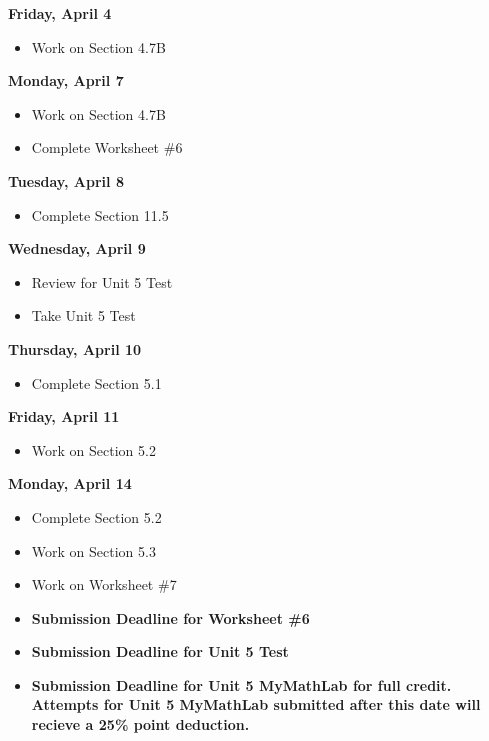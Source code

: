 \documentclass[11pt]{article}
\begin{document}
\textbf{Friday, April 4}

\begin{itemize}
\item Work on Section 4.7B
\end{itemize}

\textbf{Monday, April 7}

\begin{itemize}
\item Work on Section 4.7B
\item Complete Worksheet \#6
\end{itemize}

\textbf{Tuesday, April 8}

\begin{itemize}
\item Complete Section 11.5
\end{itemize}

\textbf{Wednesday, April 9}

\begin{itemize}
\item Review for Unit 5 Test
\item Take Unit 5 Test
\end{itemize}

\textbf{Thursday, April 10}

\begin{itemize}
\item Complete Section 5.1
\end{itemize}

\textbf{Friday, April 11}

\begin{itemize}
\item Work on Section 5.2
\end{itemize}

\textbf{Monday, April 14}

\begin{itemize}
\item Complete Section 5.2
\item Work on Section 5.3
\item Work on Worksheet \#7
\item \textbf{Submission Deadline for Worksheet \#6}
\item \textbf{Submission Deadline for Unit 5 Test}
\item \textbf{Submission Deadline for Unit 5 MyMathLab for full credit. Attempts for Unit 5 MyMathLab submitted after this date will recieve a 25\% point deduction.}
\end{itemize}
\end{document}
